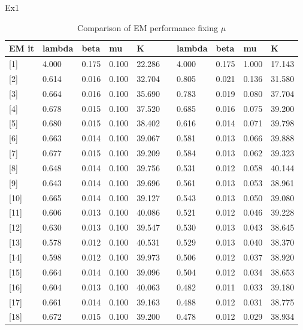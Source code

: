 \documentclass[11pt]{beamer}
\begin{document}

\begin{frame}{Ex1}
{\tiny
\begin{table}[]
\centering
\caption{Comparison of EM performance fixing $\mu$}
\label{my-label}
\begin{tabular}{l|llll|l|llll}
EM it    & lambda & beta  & mu    & K      &  & lambda & beta  & mu    & K      \\ \hline
{[}1{]}  & 4.000  & 0.175 & 0.100 & 22.286 &  & 4.000  & 0.175 & 1.000 & 17.143 \\
{[}2{]}  & 0.614  & 0.016 & 0.100 & 32.704 &  & 0.805  & 0.021 & 0.136 & 31.580 \\
{[}3{]}  & 0.664  & 0.016 & 0.100 & 35.690 &  & 0.783  & 0.019 & 0.080 & 37.704 \\
{[}4{]}  & 0.678  & 0.015 & 0.100 & 37.520 &  & 0.685  & 0.016 & 0.075 & 39.200 \\
{[}5{]}  & 0.680  & 0.015 & 0.100 & 38.402 &  & 0.616  & 0.014 & 0.071 & 39.798 \\
{[}6{]}  & 0.663  & 0.014 & 0.100 & 39.067 &  & 0.581  & 0.013 & 0.066 & 39.888 \\
{[}7{]}  & 0.677  & 0.015 & 0.100 & 39.209 &  & 0.584  & 0.013 & 0.062 & 39.323 \\
{[}8{]}  & 0.648  & 0.014 & 0.100 & 39.756 &  & 0.531  & 0.012 & 0.058 & 40.144 \\
{[}9{]}  & 0.643  & 0.014 & 0.100 & 39.696 &  & 0.561  & 0.013 & 0.053 & 38.961 \\
{[}10{]} & 0.665  & 0.014 & 0.100 & 39.127 &  & 0.543  & 0.013 & 0.050 & 39.080 \\
{[}11{]} & 0.606  & 0.013 & 0.100 & 40.086 &  & 0.521  & 0.012 & 0.046 & 39.228 \\
{[}12{]} & 0.630  & 0.013 & 0.100 & 39.547 &  & 0.530  & 0.013 & 0.043 & 38.645 \\
{[}13{]} & 0.578  & 0.012 & 0.100 & 40.531 &  & 0.529  & 0.013 & 0.040 & 38.370 \\
{[}14{]} & 0.598  & 0.012 & 0.100 & 39.973 &  & 0.506  & 0.012 & 0.037 & 38.920 \\
{[}15{]} & 0.664  & 0.014 & 0.100 & 39.096 &  & 0.504  & 0.012 & 0.034 & 38.653 \\
{[}16{]} & 0.604  & 0.013 & 0.100 & 40.063 &  & 0.482  & 0.011 & 0.033 & 39.180 \\
{[}17{]} & 0.661  & 0.014 & 0.100 & 39.163 &  & 0.488  & 0.012 & 0.031 & 38.775 \\
{[}18{]} & 0.672  & 0.015 & 0.100 & 39.200 &  & 0.478  & 0.012 & 0.029 & 38.934
\end{tabular}
\end{table}
}
\end{frame}
\end{document}
